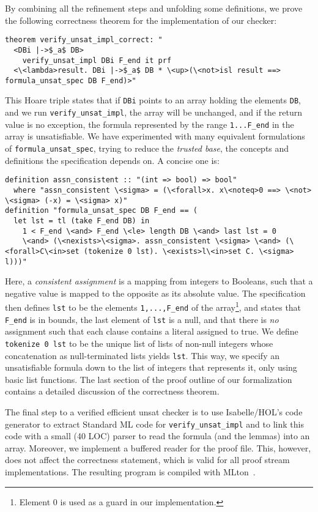\documentclass[smallcondensed]{svjour3}     %
\newcommand{\isai}{\lstinline[language=isabelle,basicstyle=\normalsize\ttfamily\slshape]}
\begin{document}
By combining all the refinement steps and unfolding some definitions, we prove the following correctness theorem for the implementation of our checker:
\begin{lstlisting}
theorem verify_unsat_impl_correct: "
  <DBi |->$_a$ DB> 
    verify_unsat_impl DBi F_end it prf
  <\<lambda>result. DBi |->$_a$ DB * \<up>(\<not>isl result ==> formula_unsat_spec DB F_end)>"
\end{lstlisting}
This Hoare triple states that if \isai$DBi$ points to an array holding the elements \isai$DB$,
and we run \isai$verify_unsat_impl$, the array will be unchanged, and if the return value is no exception,
the formula represented by the range \isai$1...F_end$ in the array is unsatisfiable. 
We have experimented with many equivalent formulations of \isai{formula_unsat_spec}, trying to reduce the \emph{trusted base}, 
\ie the concepts and definitions the specification depends on. A concise one is:
\begin{lstlisting}
definition assn_consistent :: "(int => bool) => bool"
  where "assn_consistent \<sigma> = (\<forall>x. x\<noteq>0 ==> \<not> \<sigma> (-x) = \<sigma> x)"
definition "formula_unsat_spec DB F_end == (
  let lst = tl (take F_end DB) in
    1 < F_end \<and> F_end \<le> length DB \<and> last lst = 0 
    \<and> (\<nexists>\<sigma>. assn_consistent \<sigma> \<and> (\<forall>C\<in>set (tokenize 0 lst). \<exists>l\<in>set C. \<sigma> l)))"
\end{lstlisting}
Here, a \emph{consistent assignment} is a mapping from integers to Booleans, such that a negative value is mapped to the opposite as its absolute value.
The specification then defines \isai$lst$ to be the elements \isai$1,...,F_end$ of the array\footnote{Element $0$ is used as a guard in our implementation.}, and
states that \isai$F_end$ is in bounds, the last element of \isai$lst$ is a null, and that there is \emph{no} assignment such that each clause contains a literal assigned to true. 
We define \isai{tokenize 0 lst} to be the unique list of lists of non-null integers whose concatenation as null-terminated lists yields \isai{lst}.
This way, we specify an unsatisfiable formula down to the list of integers that represents it, only using basic list functions. 
The last section of the proof outline of our formalization~\cite{GRATchk-proof-outline} contains a detailed discussion of the correctness theorem.

The final step to a verified efficient unsat checker is to use Isabelle/HOL's code generator to extract Standard ML code for \isai{verify_unsat_impl} and to
link this code with a small (40 LOC) parser to read the formula (and the lemmas) into an array. 
Moreover, we implement a buffered reader for the proof file. This, however, does not affect the correctness statement, which is 
valid for all proof stream implementations. The resulting program is compiled with MLton~\cite{MLton}.
\end{document}
